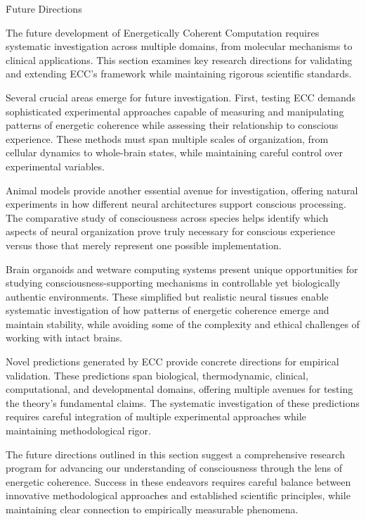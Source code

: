 \h{Future Directions}

\begin{refsection}

The future development of Energetically Coherent Computation requires systematic investigation across multiple domains, from molecular mechanisms to clinical applications. This section examines key research directions for validating and extending ECC's framework while maintaining rigorous scientific standards.

Several crucial areas emerge for future investigation. First, testing ECC demands sophisticated experimental approaches capable of measuring and manipulating patterns of energetic coherence while assessing their relationship to conscious experience. These methods must span multiple scales of organization, from cellular dynamics to whole-brain states, while maintaining careful control over experimental variables.

Animal models provide another essential avenue for investigation, offering natural experiments in how different neural architectures support conscious processing. The comparative study of consciousness across species helps identify which aspects of neural organization prove truly necessary for conscious experience versus those that merely represent one possible implementation.

Brain organoids and wetware computing systems present unique opportunities for studying consciousness-supporting mechanisms in controllable yet biologically authentic environments. These simplified but realistic neural tissues enable systematic investigation of how patterns of energetic coherence emerge and maintain stability, while avoiding some of the complexity and ethical challenges of working with intact brains.

Novel predictions generated by ECC provide concrete directions for empirical validation. These predictions span biological, thermodynamic, clinical, computational, and developmental domains, offering multiple avenues for testing the theory's fundamental claims. The systematic investigation of these predictions requires careful integration of multiple experimental approaches while maintaining methodological rigor.

The future directions outlined in this section suggest a comprehensive research program for advancing our understanding of consciousness through the lens of energetic coherence. Success in these endeavors requires careful balance between innovative methodological approaches and established scientific principles, while maintaining clear connection to empirically measurable phenomena.


\end{refsection}
